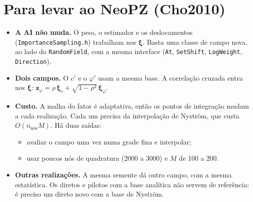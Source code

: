 \documentclass[11pt,a4paper]{article}
\begin{document}
\section{Para levar ao NeoPZ (Cho2010)}
\begin{itemize}
  \item \textbf{A AI não muda.} O peso, o estimador e os deslocamentos (\texttt{ImportanceSampling.h}) trabalham nos
    $\bm\xi$. Basta uma classe de campo nova, ao lado do \texttt{RandomField}, com a mesma interface (\texttt{At},
    \texttt{SetShift}, \texttt{LogWeight}, \texttt{Direction}).
  \item \textbf{Dois campos.} O $c'$ e o $\varphi'$ usam a mesma base. A correlação cruzada entra nos $\bm\xi$:
    $\bm z_\varphi = \rho\,\bm\xi_c + \sqrt{1-\rho^2}\,\bm\xi_\varphi$.
  \item \textbf{Custo.} A malha do fator é adaptativa, então os pontos de integração mudam a cada realização. Cada um
    precisa da interpolação de Nyström, que custa $O(n_{\text{nós}} M)$. Há duas saídas:
    \begin{itemize}
      \item avaliar o campo uma vez numa grade fina e interpolar;
      \item usar poucos nós de quadratura (2000 a 3000) e $M$ de 100 a 200.
    \end{itemize}
  \item \textbf{Outras realizações.} A mesma semente dá outro campo, com a mesma estatística. Os diretos e pilotos com a
    base analítica não servem de referência: é preciso um direto novo com a base de Nyström.
\end{itemize}
\end{document}
